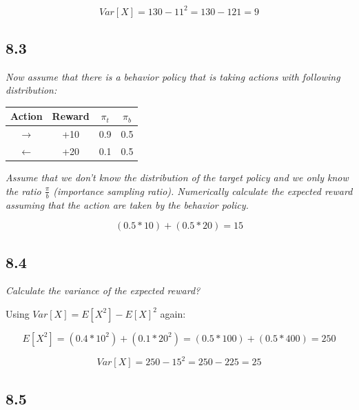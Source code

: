 \documentclass{article}
\begin{document}
\begin{equation}
    Var[X] = 130 - 11^2 = 130 - 121 = 9
\end{equation}

\subsection*{8.3}

\textit{Now assume that there is a behavior policy that is taking actions with following distribution:}

\begin{center}
    \begin{tabular}{ |c|c|c|c| }
        \hline
        Action        & Reward & $\pi_t$ & $\pi_b$ \\
        \hline
        $\rightarrow$ & +10    & 0.9     & 0.5     \\
        \hline
        $\leftarrow$  & +20    & 0.1     & 0.5     \\
        \hline
    \end{tabular}
\end{center}

\textit{Assume that we don't know the distribution of the target policy and we only know the ratio $\frac{\pi}{b}$ (importance sampling ratio). Numerically calculate the expected reward assuming that the action are taken by the behavior policy.}


\begin{equation}
    (0.5 * 10) + (0.5* 20) = 15
\end{equation}

\subsection*{8.4}

\textit{Calculate the variance of the expected reward?}

Using $Var[X] = E[X^2] - E[X]^2$ again:

\begin{equation}
    E[X^2] = (0.4 * 10^2) + (0.1*20^2) = (0.5*100) + (0.5*400) = 250
\end{equation}

\begin{equation}
    Var[X] = 250 - 15^2 = 250 - 225 = 25
\end{equation}

\subsection*{8.5}
\end{document}
